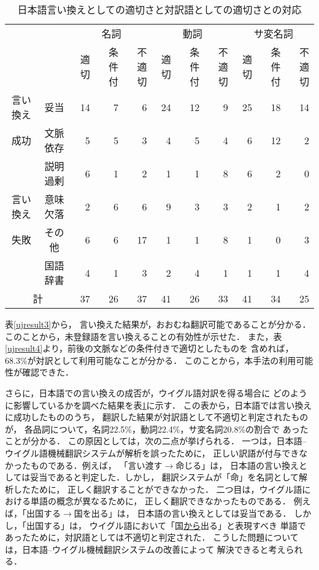      \begin{table}[t]
       \caption{\label{taiou2}日本語言い換えとしての適切さと対訳語としての適切さとの対応}
       \begin{center}
	\begin{tabular}{c|c|rrr|rrr|rrr}\hline
	 \multicolumn{2}{c|}{} & \multicolumn{3}{c|}{名詞} & \multicolumn{3}{c|}{動詞} & \multicolumn{3}{c}{サ変名詞} \\ 
	 \multicolumn{2}{c|}{} & 適切& 条件付 & 不適切 & 適切& 条件付 & 不適切 & 適切& 条件付 & 不適切\\
\hline
	 言い換え & 妥当 &  14 & 7 & 6 & 24 & 12 & 9 & 25& 18 & 14 \\ \cline{2-11}
	 成功     & 文脈依存 &  5 & 5 & 3 & 4 & 5 & 4 & 6 & 12 & 2 \\ \hline
	          & 説明過剰 &  6 & 1 & 2  & 1 & 1 &  8 &  6 & 2 & 0 \\ \cline{2-11}
	 言い換え     & 意味欠落 &  2 & 6 & 6  & 9 & 3 & 3 &  2 & 1 & 2 \\ \cline{2-11}
	 失敗         & その他   &  6 & 6 & 17 & 1 & 1 & 8 &  1 & 0 & 3 \\ \cline{2-11}
	          & 国語辞書 &  4 & 1 & 3  & 2 & 4 & 1 & 1 & 1 & 4 \\ \hline
	 \multicolumn{2}{c|}{計} & 37 & 26 & 37& 41 & 26 & 33 & 41 & 34 & 25 \\ \hline
	\end{tabular}
       \end{center}
      \end{table}   

  表\ref{ujresult3}から，
  言い換えた結果が，おおむね翻訳可能であることが分かる．
  このことから，未登録語を言い換えることの有効性が示せた．
  また，表\ref{ujresult4}より，前後の文脈などの条件付きで適切としたものを
  含めれば，68.3\%が対訳として利用可能なことが分かる．
このことから，本手法の利用可能性が確認できた．

  さらに，日本語での言い換えの成否が，ウイグル語対訳を得る場合に
  どのように影響しているかを調べた結果を表\ref{taiou2}に示す．
  この表から，日本語では言い換えに成功したもののうち，
  翻訳した結果が対訳語として不適切と判定されたものが，
各品詞について，名詞22.5\%，動詞22.4\%，サ変名詞20.8\%の割合で
あったことが分かる．
  この原因としては，次の二点が挙げられる．
  一つは，日本語--ウイグル語機械翻訳システムが解析を誤ったために，
  正しい訳語が付与できなかったものである．例えば，
  「言い渡す$\rightarrow$命じる」は，
  日本語の言い換えとしては妥当であると判定した．しかし，
  翻訳システムが「命」を名詞として解析したために，
  正しく翻訳することができなかった．
  二つ目は，ウイグル語における単語の概念が異なるために，
  正しく翻訳できなかったものである．
  例えば，「出国する$\rightarrow$国を出る」は，
  日本語の言い換えとしては妥当である．
  しかし，「出国する」は，
  ウイグル語において「国\underline{から}出る」と表現すべき
  単語であったために，対訳語としては不適切と判定された．
こうした問題については，日本語--ウイグル機械翻訳システムの改善によって
解決できると考えられる．

